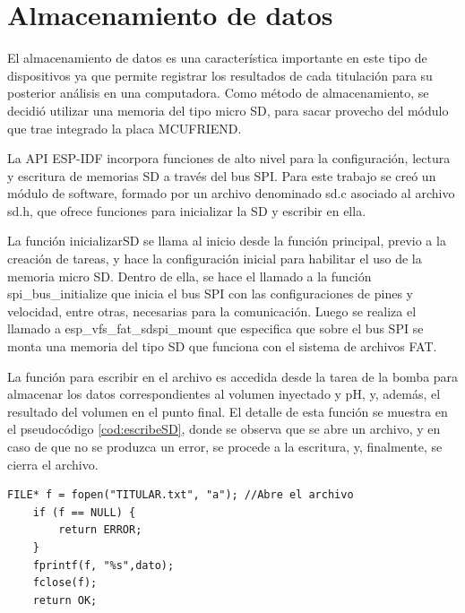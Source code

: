 \section{Almacenamiento de datos}

El almacenamiento de datos es una característica importante en este tipo de dispositivos ya que permite registrar los resultados de cada titulación para su posterior análisis en una computadora. Como método de almacenamiento, se decidió utilizar una memoria del tipo micro SD, para sacar provecho del módulo que trae integrado la placa MCUFRIEND.

La API ESP-IDF incorpora funciones de alto nivel para la configuración, lectura y escritura de memorias SD a través del bus SPI. Para este trabajo se creó un módulo de software, formado por un archivo denominado sd.c asociado al archivo sd.h, que ofrece funciones para inicializar la SD y escribir en ella.

La función inicializarSD se llama al inicio desde la función principal, previo a la creación de tareas, y hace la configuración inicial para habilitar el uso de la memoria micro SD. Dentro de ella, se hace el llamado a  la función spi\_bus\_initialize que inicia el bus SPI con las configuraciones de pines y velocidad, entre otras, necesarias para la comunicación. Luego se realiza el llamado a esp\_vfs\_fat\_sdspi\_mount que especifica que sobre el bus SPI se monta una memoria del tipo SD que funciona con el sistema de archivos FAT.

La función para escribir en el archivo es accedida desde la tarea de la bomba para almacenar los datos correspondientes al volumen inyectado y pH, y, además, el resultado del volumen en el punto final. El detalle de esta función se muestra en el pseudocódigo \ref{cod:escribeSD}, donde se observa que se abre un archivo, y en caso de que no se produzca un error, se procede a la escritura, y, finalmente, se cierra el archivo.

\begin{lstlisting}[label=cod:escribeSD,caption=Pseudocódigo de la función que escribe en la memoria SD.]
    FILE* f = fopen("TITULAR.txt", "a"); //Abre el archivo
    if (f == NULL) {
        return ERROR;
    }
    fprintf(f, "%s",dato);
    fclose(f);
    return OK;
\end{lstlisting}



